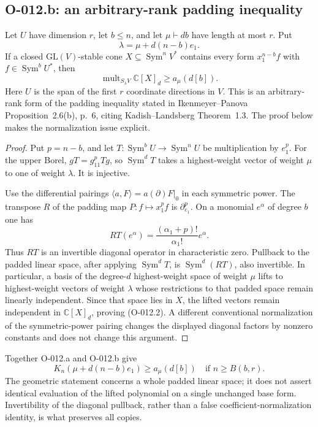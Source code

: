 \subsection{O-012.b: an arbitrary-rank padding inequality}

Let $U$ have dimension $r$, let $b\leq n$, and let
$\mu\vdash db$ have length at most $r$. Put
\[
                \lambda=\mu+d(n-b)e_1.
\]
If a closed $\mathrm{GL}(V)$-stable cone
$X\subseteq\operatorname{Sym}^n V^*$ contains every form
$x_1^{n-b}f$ with $f\in\operatorname{Sym}^b U^*$, then
\[
       \operatorname{mult}_{S_\lambda V}\mathbb C[X]_d
                                     \geq a_\mu(d[b]).  \tag{O-012.2}
\]
Here $U$ is the span of the first $r$ coordinate directions
in $V$. This is an arbitrary-rank form of the padding inequality
stated in Ikenmeyer--Panova Proposition~2.6(b), p.~6, citing
Kadish--Landsberg Theorem~1.3. The proof below makes the
normalization issue explicit.

\begin{proof}
Put $p=n-b$, and let
$T:\operatorname{Sym}^b U\to\operatorname{Sym}^n U$
be multiplication by $e_1^p$. For the upper Borel,
$gT=g_{11}^pTg$, so $\operatorname{Sym}^d T$ takes a
highest-weight vector of weight $\mu$ to one of weight
$\lambda$. It is injective.

Use the differential pairings
$\langle a,F\rangle=a(\partial)F|_0$ in each symmetric power.
The transpose $R$ of the padding map
$P:f\mapsto x_1^pf$ is $\partial_{e_1}^p$. On a monomial
$e^\alpha$ of degree $b$ one has
\[
                    RT(e^\alpha)
                    =\frac{(\alpha_1+p)!}{\alpha_1!}e^\alpha.
\]
Thus $RT$ is an invertible diagonal operator in characteristic
zero. Pullback to the padded linear space, after applying
$\operatorname{Sym}^dT$, is
$\operatorname{Sym}^d(RT)$, also invertible.
In particular, a basis of the degree-$d$ highest-weight space
of weight $\mu$ lifts to highest-weight vectors of weight
$\lambda$ whose restrictions to that padded space remain
linearly independent. Since that space lies in $X$, the lifted
vectors remain independent in $\mathbb C[X]_d$, proving
(O-012.2). A different conventional normalization of the
symmetric-power pairing changes the displayed diagonal factors
by nonzero constants and does not change this argument.
\end{proof}

Together O-012.a and O-012.b give
\[
             K_n(\mu+d(n-b)e_1)\geq a_\mu(d[b])
                 \quad\text{if }n\geq B(b,r).           \tag{O-012.3}
\]
The geometric statement concerns a whole padded linear space;
it does not assert identical evaluation of the lifted polynomial
on a single unchanged base form. Invertibility of the diagonal
pullback, rather than a false coefficient-normalization identity,
is what preserves all copies.

